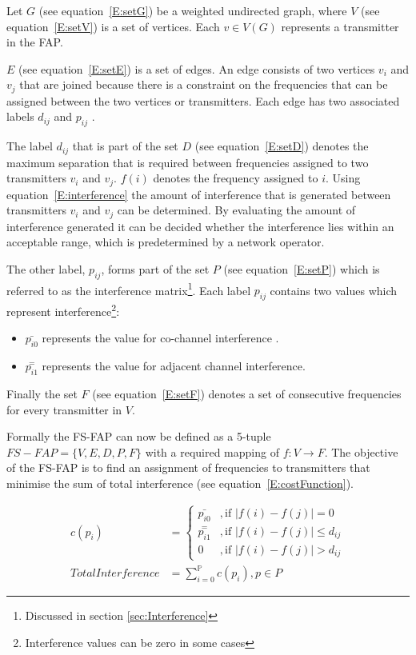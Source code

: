 Let $G$ (see equation~\ref{E:setG}) be a weighted undirected graph, where $V$ (see equation~\ref{E:setV}) is a set of vertices. Each $v \in V(G)$ represents a transmitter in the FAP. 

$E$ (see equation~\ref{E:setE}) is a set of edges. An edge consists of two vertices $v_i$ and $v_j$ that are joined because there is a constraint on the frequencies that can be assigned between the two vertices or transmitters. Each edge has two associated labels $d_{ij}$ and $p_{ij}$ \cite{FAPOrientationModel,TabuMontemanniSmith}. 

The label $d_{ij}$ that is part of the set $D$ (see equation~\ref{E:setD}) denotes the maximum separation that is required between frequencies assigned to two transmitters $v_i$ and $v_j$. $f(i)$ denotes the frequency assigned to $i$. Using equation~\ref{E:interference} the amount of interference that is generated between transmitters $v_i$ and $v_j$ can be determined. By evaluating the amount of interference generated it can be decided whether the interference lies within an acceptable range, which is predetermined by a network operator\cite{FAPOrientationModel,TabuMontemanniSmith}.

The other label, $p_{ij}$, forms part of the set $P$ (see equation~\ref{E:setP}) which is referred to as the interference matrix\footnote{Discussed in section \ref{sec:Interference}}. Each label $p_{ij}$ contains two values which represent interference\footnote{Interference values can be zero in some cases}:
\begin{itemize}
\item $\bar{p_{i0}}$ represents the value for co-channel interference \cite{FAPOrientationModel,TabuMontemanniSmith}. 
\item $\overset{=}{p_{i1}}$ represents the value for adjacent channel interference\cite{FAPOrientationModel,TabuMontemanniSmith}.
\end{itemize}

Finally the set $F$ (see equation~\ref{E:setF}) denotes a set of consecutive frequencies for every transmitter in $V$\cite{FAPOrientationModel,TabuMontemanniSmith}.

Formally the FS-FAP can now be defined as a 5-tuple \(FS-FAP = \{V,E,D,P,F\}\) with a required mapping of \(f: V \rightarrow F\)\cite{TabuMontemanniSmith}. The objective of the FS-FAP is to find an assignment of frequencies to transmitters that minimise the sum of total interference (see equation~\ref{E:costFunction}).

\begin{align} 
 c(p_i) &= 
 \begin{cases}
	\bar{p_{i0}} &,\text{if $|f(i) - f(j)| = 0$}\\
	\overset{=}{p_{i1}} &, \text{if $|f(i) - f(j)| \leqslant d_{ij}$}\\
	0 &,\text{if $|f(i) - f(j)| > d_{ij}$}
 \end{cases}\\
 \label{E:costFunction}
 Total Interference &= \sum^\mathbb{P}_{i = 0}c(p_i),p \in P 
\end{align}

